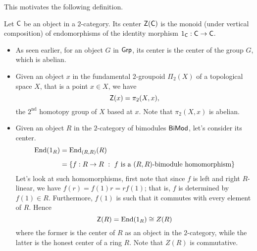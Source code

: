 \vspace*{0.1in}

This motivates the following definition.
\begin{definition}\label{centof2catobj}
Let $\mathsf{C}$ be an object in a $2$-category. Its center $\mathsf{Z}(\mathsf{C})$ is the monoid (under vertical composition) of endomorphisms of the identity morphism $1_{\mathsf{C}} : \mathsf{C} \to \mathsf{C}$.
\end{definition}

\vspace*{0.1in}

\begin{example}\label{centof2catobjex}\hfill
\begin{itemize}
\item As seen earlier, for an object $G$ in $\mathsf{Grp}$, its center is the center of the group $G$, which is abelian.
\item Given an object $x$ in the fundamental $2$-groupoid $\Pi_2(X)$ of a topological space $X$, that is a point $x \in X$, we have
\[\mathsf{Z}(x) = \pi_2(X,x),\]
the $2^{\text{nd}}$ homotopy group of $X$ based at $x$. Note that $\pi_2(X,x)$ is abelian.
\item Given an object $R$ in the $2$-category of bimodules $\mathsf{BiMod}$, let's consider its center.
\begin{align*}
\mathrm{End}(1_{R}) &= \mathrm{End}_{(R,R)}(R)\\[0.5em]
&= \left\{f:R \to R\ :\ f \text{ is a $(R,R)$-bimodule homomorphism}\right\}
\end{align*}
Let's look at such homomorphisms, first note that since $f$ is left and right $R$-linear, we have $f(r) = f(1)r = rf(1)$; that is, $f$ is determined by $f(1) \in R$. Furthermore, $f(1)$ is such that it commutes with every element of $R$. Hence
\[\mathsf{Z}(R) = \mathrm{End}(1_R) \cong Z(R)\]
where the former is the center of $R$ as an object in the $2$-category, while the latter is the honest center of a ring $R$. Note that $Z(R)$ is commutative.
\end{itemize}
\end{example}

\vspace*{0.1in}

